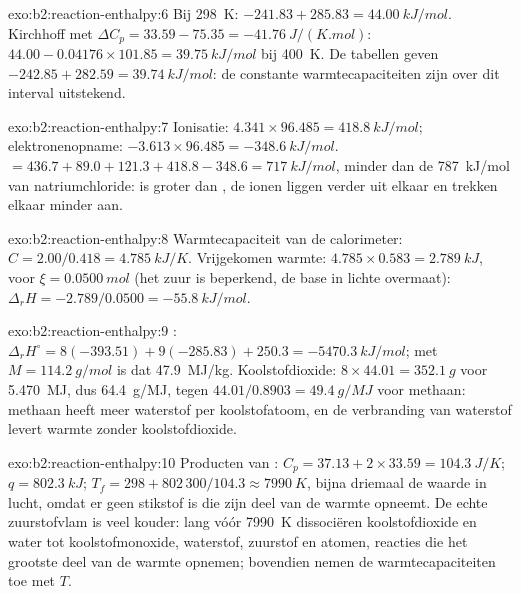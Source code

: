 \begin{solution}{exo:b2:reaction-enthalpy:6}
Bij \qty{298}{K}: $-241.83 + 285.83 = \qty{44.00}{kJ/mol}$. Kirchhoff met
$\Delta C_p = 33.59 - 75.35 = \qty{-41.76}{J/(K.mol)}$:
$44.00 - 0.04176 \times 101.85 = \qty{39.75}{kJ/mol}$ bij \qty{400}{K}. De
tabellen geven $-242.85 + 282.59 = \qty{39.74}{kJ/mol}$: de constante
warmtecapaciteiten zijn over dit interval uitstekend.
\end{solution}

\begin{solution}{exo:b2:reaction-enthalpy:7}
Ionisatie: $4.341 \times 96.485 = \qty{418.8}{kJ/mol}$; elektronenopname:
$-3.613 \times 96.485 = \qty{-348.6}{kJ/mol}$.  $= 436.7 +
89.0 + 121.3 + 418.8 - 348.6 = \qty{717}{kJ/mol}$, minder dan de
\qty{787}{kJ/mol} van natriumchloride:  is groter dan , de
ionen liggen verder uit elkaar en trekken elkaar minder aan.
\end{solution}

\begin{solution}{exo:b2:reaction-enthalpy:8}
Warmtecapaciteit van de calorimeter: $C = 2.00/0.418 = \qty{4.785}{kJ/K}$.
Vrijgekomen warmte: $4.785 \times 0.583 = \qty{2.789}{kJ}$, voor $\xi =
\qty{0.0500}{mol}$ (het zuur is beperkend, de base in lichte overmaat):
$\Delta_r H = -2.789/0.0500 = \qty{-55.8}{kJ/mol}$.
\end{solution}

\begin{solution}{exo:b2:reaction-enthalpy:9}
: $\Delta_r H^\circ =
8(-393.51) + 9(-285.83) + 250.3 = \qty{-5470.3}{kJ/mol}$; met $M =
\qty{114.2}{g/mol}$ is dat \qty{47.9}{MJ/kg}. Koolstofdioxide: $8 \times 44.01 =
\qty{352.1}{g}$ voor \qty{5.470}{MJ}, dus \qty{64.4}{g/MJ}, tegen
$44.01/0.8903 = \qty{49.4}{g/MJ}$ voor methaan: methaan heeft meer waterstof per
koolstofatoom, en de verbranding van waterstof levert warmte zonder koolstofdioxide.
\end{solution}

\begin{solution}{exo:b2:reaction-enthalpy:10}
Producten van : $C_p = 37.13 + 2 \times 33.59 =
\qty{104.3}{J/K}$; $q = \qty{802.3}{kJ}$; $T_f = 298 + 802\,300/104.3 \approx
\qty{7990}{K}$, bijna driemaal de waarde in lucht, omdat er geen stikstof is
die zijn deel van de warmte opneemt. De echte zuurstofvlam is veel kouder: lang vóór \qty{7990}{K} dissociëren koolstofdioxide en water
tot koolstofmonoxide, waterstof, zuurstof en atomen, 
reacties die het grootste deel van de warmte opnemen; bovendien nemen de warmtecapaciteiten toe met
$T$.
\end{solution}

